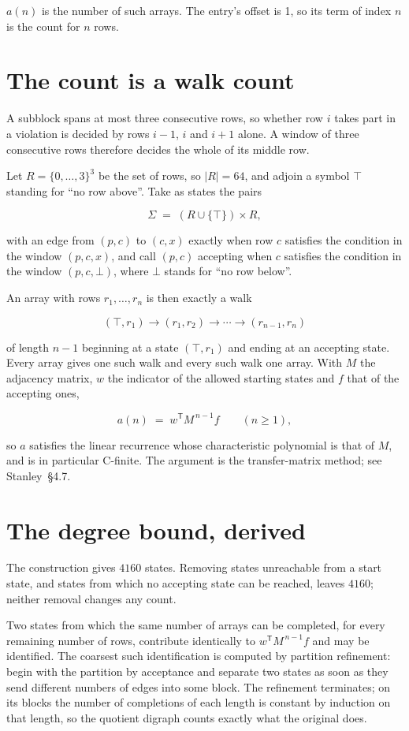 \documentclass[11pt]{article}
\theoremstyle{definition}
\begin{document}
$a(n)$ is the number of such arrays. The entry's offset is 1, so its term of index $n$ is the count for $n$ rows.

\section{The count is a walk count}

A subblock spans at most three consecutive rows, so whether row $i$ takes part in a violation is decided by rows $i-1$, $i$ and $i+1$ alone. A window of three consecutive rows therefore decides the whole of its middle row.

Let $R = \{0,\dots,3\}^{3}$ be the set of rows, so $|R| = 64$, and adjoin a symbol $\top$ standing for ``no row above''. Take as states the pairs

\[\Sigma \;=\; (R \cup \{\top\}) \times R,\]

with an edge from $(p,c)$ to $(c,x)$ exactly when row $c$ satisfies the condition in the window $(p,c,x)$, and call $(p,c)$ accepting when $c$ satisfies the condition in the window $(p,c,\bot)$, where $\bot$ stands for ``no row below''.

An array with rows $r_1,\dots,r_n$ is then exactly a walk

\[(\top,r_1) \to (r_1,r_2) \to \cdots \to (r_{n-1},r_n)\]

of length $n-1$ beginning at a state $(\top,r_1)$ and ending at an accepting state. Every array gives one such walk and every such walk one array. With $M$ the adjacency matrix, $w$ the indicator of the allowed starting states and $f$ that of the accepting ones,

\[a(n) \;=\; w^{\mathsf T} M^{\,n-1} f \qquad (n \ge 1),\]

so $a$ satisfies the linear recurrence whose characteristic polynomial is that of $M$, and is in particular C-finite. The argument is the transfer-matrix method; see Stanley~\S4.7.

\section{The degree bound, derived}

The construction gives $4160$ states. Removing states unreachable from a start state, and states from which no accepting state can be reached, leaves $4160$; neither removal changes any count.

Two states from which the same number of arrays can be completed, for every remaining number of rows, contribute identically to $w^{\mathsf T}M^{\,n-1}f$ and may be identified. The coarsest such identification is computed by partition refinement: begin with the partition by acceptance and separate two states as soon as they send different numbers of edges into some block. The refinement terminates; on its blocks the number of completions of each length is constant by induction on that length, so the quotient digraph counts exactly what the original does.
\end{document}
